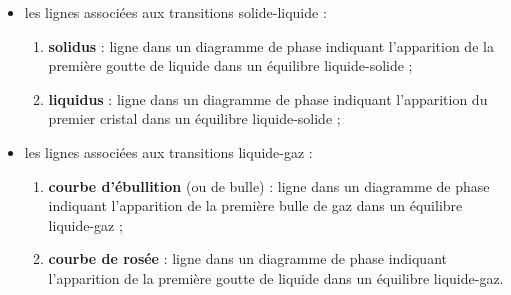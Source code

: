 \documentclass[12pt, a3paper, portrait]{tikzposter}
\begin{document}
\begin{columns}
{	\begin{itemize}
\item les lignes associées aux transitions solide-liquide :
\begin{enumerate}
\item \textbf{solidus} : ligne dans un diagramme de phase indiquant l'apparition de la première goutte de liquide dans un équilibre liquide-solide ;
\item \textbf{liquidus} : ligne dans un diagramme de phase indiquant l'apparition du premier cristal dans un équilibre liquide-solide ;
\end{enumerate}
\item les lignes associées aux transitions liquide-gaz :
\begin{enumerate}
\item \textbf{courbe d'ébullition} (ou de bulle) : ligne dans un diagramme de phase indiquant l'apparition de la première bulle de gaz dans un équilibre liquide-gaz ;
\item \textbf{courbe de rosée} : ligne dans un diagramme de phase indiquant l'apparition de la première goutte de liquide dans un équilibre liquide-gaz.
\end{enumerate}
	\end{itemize}}

\end{columns}
\end{document}
